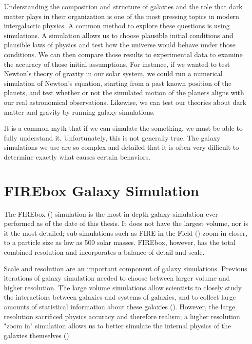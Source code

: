 
Understanding the composition and structure of galaxies and the role that dark matter plays in their organization is one of the most pressing topics in modern intergalactic physics. A common method to explore these questions is using simulations. A simulation allows us to choose plausible initial conditions and plausible laws of physics and test how the universe would behave under those conditions. We can then compare those results to experimental data to examine the accuracy of those initial assumptions. For instance, if we wanted to test Newton's theory of gravity in our solar system, we could run a numerical simulation of Newton's equation, starting from a past known position of the planets, and test whether or not the simulated motion of the planets aligns with our real astronomical observations. Likewise, we can test our theories about dark matter and gravity by running galaxy simulations.

It is a common myth that if we can simulate the something, we must be able to fully understand it. Unfortunately, this is not generally true. The galaxy simulations we use are so complex and detailed that it is often very difficult to determine exactly what causes certain behaviors. 

\section{FIREbox Galaxy Simulation}
The FIREbox (\cite{feldmannFIREboxSimulatingGalaxies2022}) simulation is the most in-depth galaxy simulation ever performed as of the date of this thesis. It does not have the largest volume, nor is it the most detailed; sub-simulations such as FIRE in the Field (\cite{fittsFireFieldSimulating2017}) zoom in closer, to a particle size as low as 500 solar masses. FIREbox, however, has the total combined resolution and incorporates a balance of detail and scale.

Scale and resolution are an important component of galaxy simulations. Previous iterations of galaxy simulation needed to choose between larger volume and higher resolution. The large volume simulations allow scientists to closely study the interactions between galaxies and systems of galaxies, and to collect large amounts of statistical information about these galaxies (\cite{feldmannFIREboxSimulatingGalaxies2022}). However, the large resolution sacrificed physics accuracy and therefore realism; a higher resolution "zoom in" simulation allows us to better simulate the internal physics of the galaxies themselves (\cite{feldmannFIREboxSimulatingGalaxies2022})



